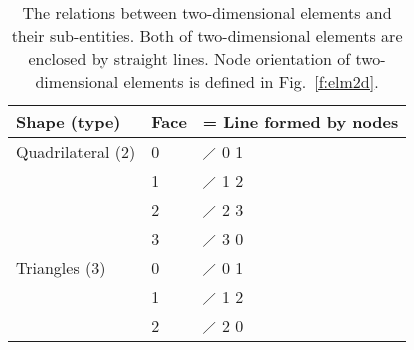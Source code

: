 \documentclass[11pt,dvips]{article}
\newcommand{\topcaption}{%
\setlength{\abovecaptionskip}{0pt}%
\setlength{\belowcaptionskip}{10pt}%
\caption}
\numberwithin{equation}{section}
\begin{document}
%
\begin{table}[h]
\centering

\topcaption{
%
The relations between two-dimensional elements and their sub-entities.  Both of
two-dimensional elements are enclosed by straight lines.  Node orientation of
two-dimensional elements is defined in Fig.~\ref{f:elm2d}.
%
}

\label{t:subent2d}
\begin{tabular}{lll}
\toprule
Shape (type)      & Face & = Line formed by nodes \\
\midrule
Quadrilateral (2) & 0    & $\diagup$ 0 1          \\
                  & 1    & $\diagup$ 1 2          \\
                  & 2    & $\diagup$ 2 3          \\
                  & 3    & $\diagup$ 3 0          \\
\midrule
Triangles (3)     & 0    & $\diagup$ 0 1          \\
                  & 1    & $\diagup$ 1 2          \\
                  & 2    & $\diagup$ 2 0          \\
\bottomrule
\end{tabular}
\end{table}
%
\end{document}
